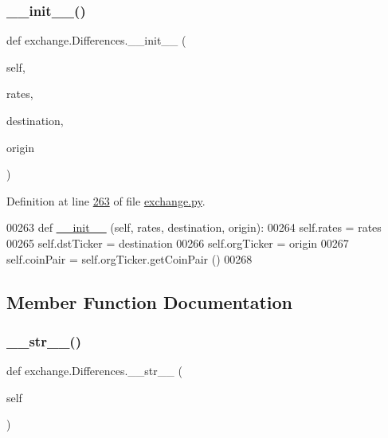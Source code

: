 \subsubsection{\texorpdfstring{\+\_\+\+\_\+init\+\_\+\+\_\+()}{\_\_init\_\_()}}
{\footnotesize\ttfamily def exchange.\+Differences.\+\_\+\+\_\+init\+\_\+\+\_\+ (\begin{DoxyParamCaption}\item[{}]{self,  }\item[{}]{rates,  }\item[{}]{destination,  }\item[{}]{origin }\end{DoxyParamCaption})}



Definition at line \hyperlink{exchange_8py_source_l00263}{263} of file \hyperlink{exchange_8py_source}{exchange.\+py}.


\begin{DoxyCode}
00263     \textcolor{keyword}{def }\hyperlink{namespacestart__time_a9c9bd378729a13c96a22c8b079ea172c}{\_\_init\_\_} (self, rates, destination, origin):
00264         self.rates     = rates
00265         self.dstTicker = destination
00266         self.orgTicker = origin
00267         self.coinPair  = self.orgTicker.getCoinPair ()
00268         
\end{DoxyCode}


\subsection{Member Function Documentation}
\mbox{\label{classexchange_1_1_differences_af7c7e7d5c268a1229f78f0ee911cbbe9}} 
\subsubsection{\texorpdfstring{\+\_\+\+\_\+str\+\_\+\+\_\+()}{\_\_str\_\_()}}
{\footnotesize\ttfamily def exchange.\+Differences.\+\_\+\+\_\+str\+\_\+\+\_\+ (\begin{DoxyParamCaption}\item[{}]{self }\end{DoxyParamCaption})}



